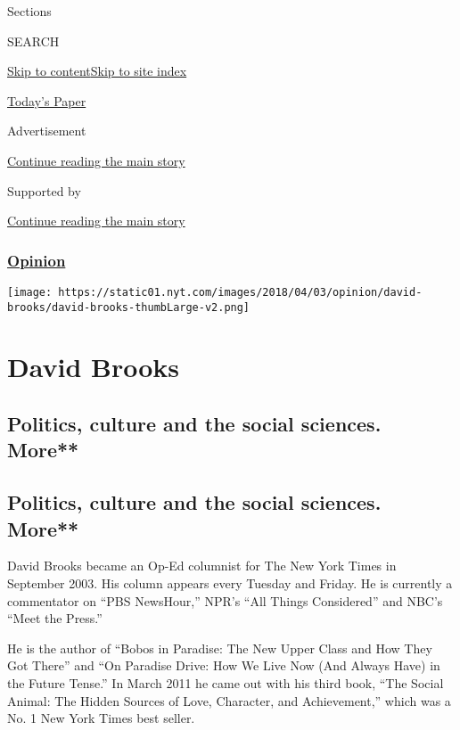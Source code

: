Sections

SEARCH

\protect\hyperlink{site-content}{Skip to
content}\protect\hyperlink{site-index}{Skip to site index}

\href{https://myaccount.nytimes.com/auth/login?response_type=cookie\&client_id=vi}{}

\href{https://www.nytimes.com/section/todayspaper}{Today's Paper}

Advertisement

\protect\hyperlink{after-top}{Continue reading the main story}

Supported by

\protect\hyperlink{after-sponsor}{Continue reading the main story}

\hypertarget{opinion}{%
\subsubsection{\texorpdfstring{\href{/section/opinion}{Opinion}}{Opinion}}\label{opinion}}

\texttt{[image: https://static01.nyt.com/images/2018/04/03/opinion/david-brooks/david-brooks-thumbLarge-v2.png]}

\hypertarget{david-brooks}{%
\section{David Brooks}\label{david-brooks}}

\hypertarget{politics-culture-and-the-social-sciences-more}{%
\subsection{Politics, culture and the social sciences.
More**}\label{politics-culture-and-the-social-sciences-more}}

\hypertarget{politics-culture-and-the-social-sciences-more-1}{%
\subsection{Politics, culture and the social sciences.
More**}\label{politics-culture-and-the-social-sciences-more-1}}

David Brooks became an Op-Ed columnist for The New York Times in
September 2003. His column appears every Tuesday and Friday. He is
currently a commentator on ``PBS NewsHour,'' NPR's ``All Things
Considered'' and NBC's ``Meet the Press.''

He is the author of ``Bobos in Paradise: The New Upper Class and How
They Got There'' and ``On Paradise Drive: How We Live Now (And Always
Have) in the Future Tense.'' In March 2011 he came out with his third
book, ``The Social Animal: The Hidden Sources of Love, Character, and
Achievement,'' which was a No. 1 New York Times best seller.


